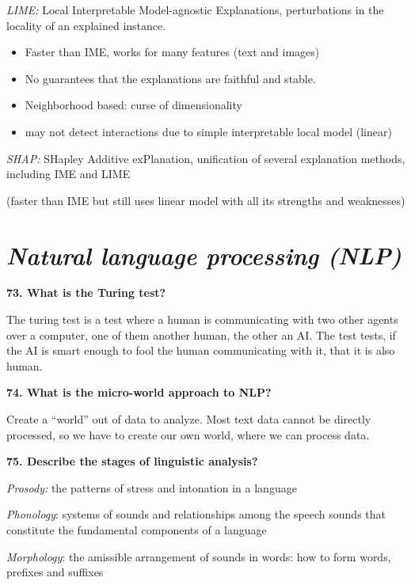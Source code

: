 \textit{LIME:} Local Interpretable Model-agnostic Explanations,
perturbations in the locality of an explained
instance.

\begin{itemize}
\item Faster than IME, works for many features (text and images)
\item No guarantees that the explanations are faithful and stable.
\item Neighborhood based: curse of dimensionality
\item may not detect interactions due to simple interpretable local model (linear)
\end{itemize}

\textit{SHAP:} SHapley Additive exPlanation, unification of several
explanation methods, including IME and LIME

(faster than IME but still uses linear model with all its strengths and
weaknesses)

\hypertarget{natural-language-processing-nlp}{%
\section{\texorpdfstring{\textit{Natural language processing
(NLP)}}{Natural language processing (NLP)}}\label{natural-language-processing-nlp}}

\textbf{73. What is the Turing test?}

The turing test is a test where a human is communicating with two other
agents over a computer, one of them another human, the other an AI. The
test tests, if the AI is smart enough to fool the human communicating
with it, that it is also human.

\textbf{74. What is the micro-world approach to NLP?}

Create a ``world'' out of data to analyze. Most text data cannot be
directly processed, so we have to create our own world, where we can
process data.

\textbf{75. Describe the stages of linguistic analysis?}

\textit{Prosody:} the patterns of stress and intonation in a language

\textit{Phonology}: systems of sounds and relationships among the
speech sounds that constitute the fundamental components of a language

\textit{Morphology}: the amissible arrangement of sounds in words:
how to form words, prefixes and suffixes

